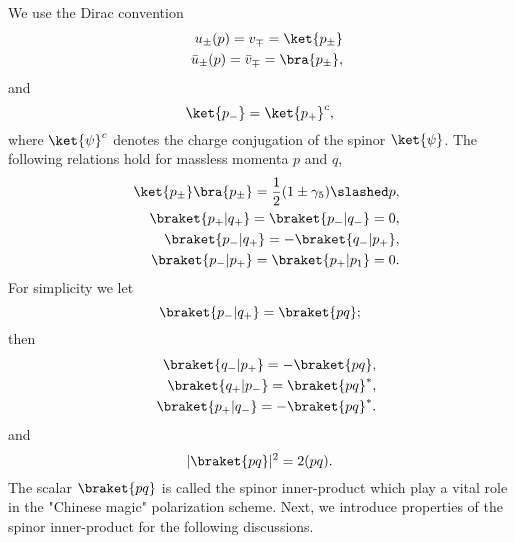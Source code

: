 We use the Dirac convention
\begin{eqnarray}
&&u_\pm(p)=v_\mp=\ket{p_\pm}\nonumber\\
&&\bar{u}_\pm(p)=\bar{v}_\mp=\bra{p_\pm},
\end{eqnarray}
and 
\begin{equation}
\ket{p_-}=\ket{p_+}^c,
\end{equation}
where $\ket{\psi}^c$ denotes the charge conjugation of the spinor $\ket{\psi}$. The following relations hold for massless momenta $p$ and $q$,
\begin{eqnarray}
&&\ket{p_\pm}\bra{p_\pm}=\frac{1}{2}(1\pm\gamma_5)\slashed p,\\
&&\braket{p_+|q_+}=\braket{p_-|q_-}=0,\\
&&\braket{p_-|q_+}=-\braket{q_-|p_+},\\
&&\braket{p_-|p_+}=\braket{p_+|p_1}=0.
\end{eqnarray}
For simplicity we let
\begin{equation}
\braket{p_-|q_+}=\braket{pq};
\end{equation}
then
\begin{eqnarray}
&&\braket{q_-|p_+}=-\braket{pq},\nonumber\\
&&\braket{q_+|p_-}=\braket{pq}^{\ast},\nonumber\\
&&\braket{p_+|q_-}=-\braket{pq}^\ast.
\end{eqnarray}
and 
\begin{equation}
|\braket{pq}|^2=2(pq).
\end{equation}
The scalar $\braket{pq}$ is called the spinor inner-product \cite{ZZL} which play a vital role in the "Chinese magic" polarization scheme. Next, we introduce properties of the spinor inner-product for the following discussions.

